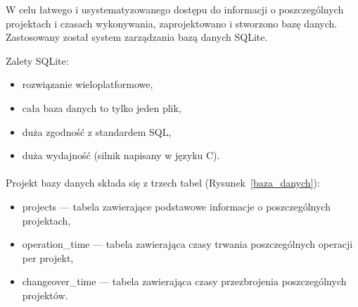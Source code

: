 \breakparagraph{}
W celu łatwego i usystematyzowanego dostępu do informacji o poszczególnych projektach i czasach wykonywania, zaprojektowano i stworzono bazę danych. Zastosowany został system zarządzania bazą danych SQLite.

\breakparagraph{}
Zalety SQLite:
\begin{itemize}
	\item rozwiązanie wieloplatformowe,
	\item cała baza danych to tylko jeden plik,
	\item duża zgodność z standardem SQL,
	\item duża wydajność (silnik napisany w języku C).
\end{itemize}

\paragraph{}
Projekt bazy danych składa się z trzech tabel (Rysunek~\ref{baza_danych}):
\begin{itemize}
	\item projects --- tabela zawierające podstawowe informacje o poszczególnych projektach,
	\item operation\_time --- tabela zawierająca czasy trwania poszczególnych operacji per projekt,
	\item changeover\_time --- tabela zawierająca czasy przezbrojenia poszczególnych projektów.
\end{itemize}

